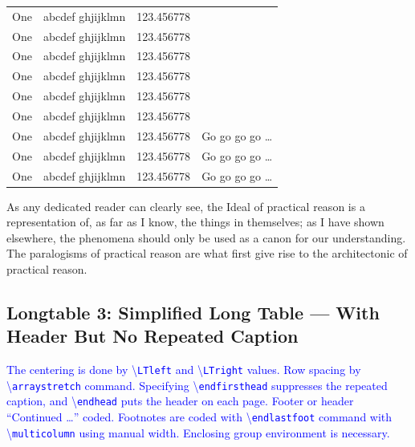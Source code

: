 \documentclass[phd]{ndsu-thesis-2022}
\newcommand\italk[1]{\textcolor{blue}{#1}}  %
\newcommand\cmd[1]{\textbackslash\texttt{#1}}  %
\begin{document}
\begin{longtable}{l l l l}
One & abcdef ghjijklmn & 123.456778 \\
One & abcdef ghjijklmn & 123.456778 \\
One & abcdef ghjijklmn & 123.456778 \\
One & abcdef ghjijklmn & 123.456778 \\
One & abcdef ghjijklmn & 123.456778 \\
One & abcdef ghjijklmn & 123.456778 \\
One & abcdef ghjijklmn & 123.456778  & Go go go go \ldots \\
One & abcdef ghjijklmn & 123.456778  & Go go go go \ldots \\
One & abcdef ghjijklmn & 123.456778  & Go go go go \ldots \\
\bottomrule
\end{longtable}
\endgroup

As any dedicated reader can clearly see, the Ideal of practical reason is a representation
of, as far as I know, the things in themselves; as I have shown elsewhere, the phenomena
should only be used as a canon for our understanding. The paralogisms of practical reason
are what first give rise to the architectonic of practical reason.


\subsection{Longtable 3: Simplified Long Table --- With Header But No Repeated Caption }

\italk{The centering is done by \cmd{LTleft} and \cmd{LTright} values. Row spacing by \cmd{arraystretch} command. Specifying \cmd{endfirsthead} suppresses the repeated caption, and \cmd{endhead} puts the header on each page. Footer or header ``Continued \ldots'' coded. Footnotes are coded with \cmd{endlastfoot} command with \cmd{multicolumn} using manual width. Enclosing group environment is necessary.}
\end{document}
